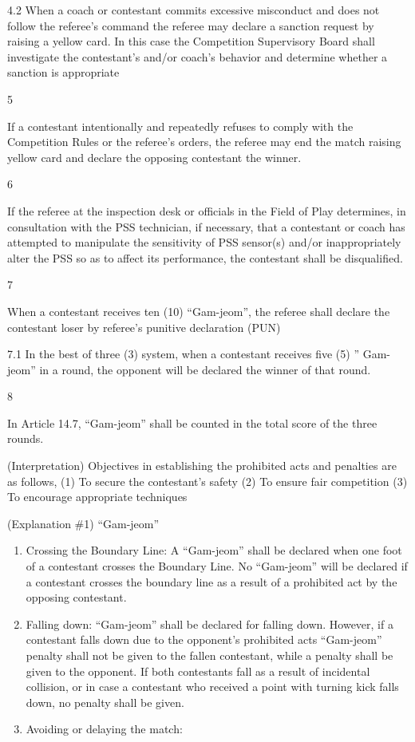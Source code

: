 \documentclass[
]{report}
\renewcommand{\labelenumi}{\arabic{enumi}}
\begin{document}
4.2 When a coach or contestant commits excessive misconduct and does not
follow the referee's command the referee may declare a sanction request
by raising a yellow card. In this case the Competition Supervisory Board
shall investigate the contestant's and/or coach's behavior and determine
whether a sanction is appropriate

5

If a contestant intentionally and repeatedly refuses to comply with the
Competition Rules or the referee's orders, the referee may end the match
raising yellow card and declare the opposing contestant the winner.

6

If the referee at the inspection desk or officials in the Field of Play
determines, in consultation with the PSS technician, if necessary, that
a contestant or coach has attempted to manipulate the sensitivity of PSS
sensor(s) and/or inappropriately alter the PSS so as to affect its
performance, the contestant shall be disqualified.

7

When a contestant receives ten (10) ``Gam-jeom'', the referee shall
declare the contestant loser by referee's punitive declaration (PUN)

7.1 In the best of three (3) system, when a contestant receives five (5)
'' Gam-jeom'' in a round, the opponent will be declared the winner of
that round.

8

In Article 14.7, ``Gam-jeom'' shall be counted in the total score of the
three rounds.

(Interpretation) Objectives in establishing the prohibited acts and
penalties are as follows, (1) To secure the contestant's safety (2) To
ensure fair competition (3) To encourage appropriate techniques

(Explanation \#1) ``Gam-jeom''

\begin{enumerate}
\def\labelenumi{\roman{enumi}.}
\item
  Crossing the Boundary Line: A ``Gam-jeom'' shall be declared when one
  foot of a contestant crosses the Boundary Line. No ``Gam-jeom'' will
  be declared if a contestant crosses the boundary line as a result of a
  prohibited act by the opposing contestant.
\item
  Falling down: ``Gam-jeom'' shall be declared for falling down.
  However, if a contestant falls down due to the opponent's prohibited
  acts ``Gam-jeom'' penalty shall not be given to the fallen contestant,
  while a penalty shall be given to the opponent. If both contestants
  fall as a result of incidental collision, or in case a contestant who
  received a point with turning kick falls down, no penalty shall be
  given.
\item
  Avoiding or delaying the match:
\end{enumerate}
\end{document}
